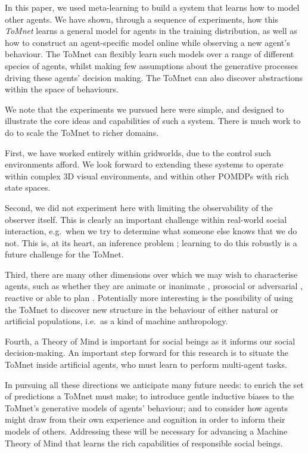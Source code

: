 \documentclass{article}
\begin{document}
In this paper, we used meta-learning to build a system that learns how to model other agents. We have shown, through a sequence of experiments, how this {\it ToMnet} learns a general model for agents in the training distribution, as well as how to construct an agent-specific model online while observing a new agent's behaviour. The ToMnet can flexibly learn such models over a range of different species of agents, whilst making few assumptions about the generative processes driving these agents' decision making. The ToMnet can also discover abstractions within the space of behaviours.

We note that the experiments we pursued here were simple, and designed to illustrate the core ideas and capabilities of such a system. There is much work to do to scale the ToMnet to richer domains.

First, we have worked entirely within gridworlds, due to the control such environments afford. We look forward to extending these systems to operate within complex 3D visual environments, and within other POMDPs with rich state spaces.

Second, we did not experiment here with limiting the observability of the observer itself. This is clearly an important challenge within real-world social interaction, e.g.\ when we try to determine what someone else knows that we do not. This is, at its heart, an inference problem \cite{Baker2017}; learning to do this robustly is a future challenge for the ToMnet.

Third, there are many other dimensions over which we may wish to characterise agents, such as whether they are animate or inanimate \cite{scholl2000perceptual}, prosocial or adversarial \cite{ullman2009help}, reactive or able to plan \cite{sutton1998reinforcement}. Potentially more interesting is the possibility of using the ToMnet to discover new structure in the behaviour of either natural or artificial populations, i.e.\ as a kind of machine anthropology.

Fourth, a Theory of Mind is important for social beings as it informs our social decision-making. An important step forward for this research is to situate the ToMnet inside artificial agents, who must learn to perform multi-agent tasks.

In pursuing all these directions we anticipate many future needs: to enrich the set of predictions a ToMnet must make; to introduce gentle inductive biases to the ToMnet's generative models of agents' behaviour; and to consider how agents might draw from their own experience and cognition in order to inform their models of others. Addressing these will be necessary for advancing a Machine Theory of Mind that learns the rich capabilities of responsible social beings.
\end{document}
